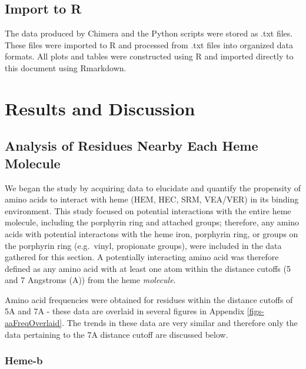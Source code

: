 \documentclass[a4paper, nobind]{templates/ociamthesis}
\begin{document}
\hypertarget{import-to-r}{%
\section{Import to R}\label{import-to-r}}

The data produced by Chimera and the Python scripts were stored as .txt files. These files were imported to R and processed from .txt files into organized data formats. All plots and tables were constructed using R and imported directly to this document using Rmarkdown.

\adjustmtc
{}

\adjustmtc
{}

\hypertarget{discussion}{%
\chapter{Results and Discussion}\label{discussion}}

\minitoc

\hypertarget{disc-aaFreq}{%
\section{Analysis of Residues Nearby Each Heme Molecule}\label{disc-aaFreq}}

We began the study by acquiring data to elucidate and quantify the propensity of amino acids to interact with heme (HEM, HEC, SRM, VEA/VER) in its binding environment. This study focused on potential interactions with the entire heme molecule, including the porphyrin ring and attached groups; therefore, any amino acids with potential interactons with the heme iron, porphyrin ring, or groups on the porphyrin ring (e.g.~vinyl, propionate groups), were included in the data gathered for this section. A potentially interacting amino acid was therefore defined as any amino acid with at least one atom within the distance cutoffs (5 and 7 Angstroms (A)) from the heme \emph{molecule}.

Amino acid frequencies were obtained for residues within the distance cutoffs of 5A and 7A - these data are overlaid in several figures in Appendix \ref{figs-aaFreqOverlaid}. The trends in these data are very similar and therefore only the data pertaining to the 7A distance cutoff are discussed below.

\hypertarget{heme-b-1}{%
\subsection{Heme-b}\label{heme-b-1}}
\end{document}
